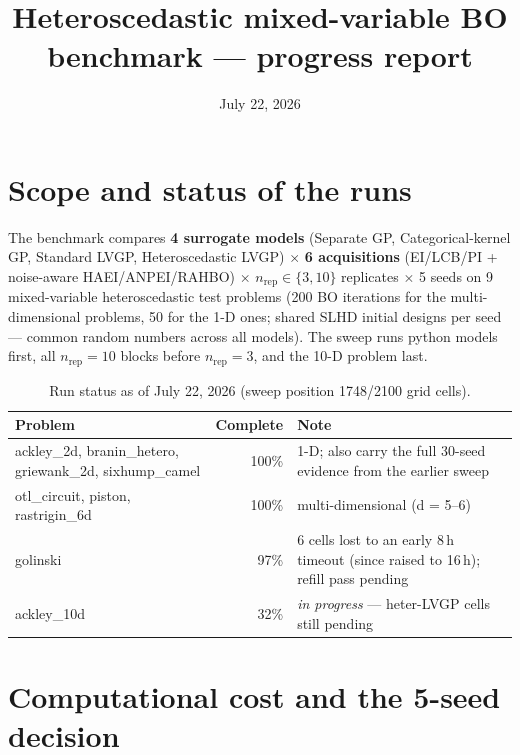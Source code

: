 \documentclass[11pt]{article}
\title{Heteroscedastic mixed-variable BO benchmark --- progress report}
\author{}
\date{July 22, 2026}
\begin{document}
\maketitle

\section{Scope and status of the runs}

The benchmark compares \textbf{4 surrogate models} (Separate GP, Categorical-kernel GP,
Standard LVGP, Heteroscedastic LVGP) $\times$ \textbf{6 acquisitions} (EI/LCB/PI +
noise-aware HAEI/ANPEI/RAHBO) $\times$ $n_{\mathrm{rep}}\in\{3,10\}$ replicates $\times$
5 seeds on 9 mixed-variable heteroscedastic test problems (200 BO iterations for the
multi-dimensional problems, 50 for the 1-D ones; shared SLHD initial designs per seed ---
common random numbers across all models). The sweep runs python models first, all
$n_{\mathrm{rep}}{=}10$ blocks before $n_{\mathrm{rep}}{=}3$, and the 10-D problem last.

\begin{table}[h]
\centering\small
\begin{tabular}{lrl}
\toprule
Problem & Complete & Note \\
\midrule
ackley\_2d, branin\_hetero, griewank\_2d, sixhump\_camel & 100\% & 1-D; also carry the full 30-seed evidence from the earlier sweep \\
otl\_circuit, piston, rastrigin\_6d & 100\% & multi-dimensional (d = 5--6) \\
golinski & 97\% & 6 cells lost to an early 8\,h timeout (since raised to 16\,h); refill pass pending \\
ackley\_10d & 32\% & \emph{in progress} --- heter-LVGP cells still pending \\
\bottomrule
\end{tabular}
\caption{Run status as of July 22, 2026 (sweep position 1748/2100 grid cells).}
\end{table}

\section{Computational cost and the 5-seed decision}
\end{document}

